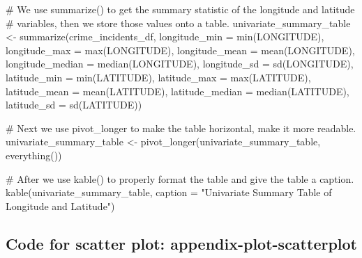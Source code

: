 \documentclass[
]{article}
\newenvironment{Shaded}{}{}
\newcommand{\AttributeTok}[1]{#1}
\newcommand{\CommentTok}[1]{\textcolor[rgb]{0.00,0.50,0.00}{#1}}
\newcommand{\FunctionTok}[1]{#1}
\newcommand{\NormalTok}[1]{#1}
\newcommand{\OtherTok}[1]{\textcolor[rgb]{1.00,0.25,0.00}{#1}}
\newcommand{\StringTok}[1]{\textcolor[rgb]{0.00,0.50,0.50}{#1}}
\begin{document}
\begin{Shaded}
\begin{Highlighting}[]
\CommentTok{\# We use summarize() to get the summary statistic of the longitude and latitude }
\CommentTok{\# variables, then we store those values onto a table.}
\NormalTok{univariate\_summary\_table }\OtherTok{\textless{}{-}} \FunctionTok{summarize}\NormalTok{(crime\_incidents\_df,}
                                      \AttributeTok{longitude\_min =} \FunctionTok{min}\NormalTok{(LONGITUDE),}
                                      \AttributeTok{longitude\_max =} \FunctionTok{max}\NormalTok{(LONGITUDE),}
                                      \AttributeTok{longitude\_mean =} \FunctionTok{mean}\NormalTok{(LONGITUDE),}
                                      \AttributeTok{longitude\_median =} \FunctionTok{median}\NormalTok{(LONGITUDE),}
                                      \AttributeTok{longitude\_sd =} \FunctionTok{sd}\NormalTok{(LONGITUDE),}
                                      \AttributeTok{latitude\_min =} \FunctionTok{min}\NormalTok{(LATITUDE),}
                                      \AttributeTok{latitude\_max =} \FunctionTok{max}\NormalTok{(LATITUDE),}
                                      \AttributeTok{latitude\_mean =} \FunctionTok{mean}\NormalTok{(LATITUDE),}
                                      \AttributeTok{latitude\_median =} \FunctionTok{median}\NormalTok{(LATITUDE),}
                                      \AttributeTok{latitude\_sd =} \FunctionTok{sd}\NormalTok{(LATITUDE)) }

\CommentTok{\# Next we use pivot\_longer to make the table horizontal, make it more readable.}
\NormalTok{univariate\_summary\_table }\OtherTok{\textless{}{-}} \FunctionTok{pivot\_longer}\NormalTok{(univariate\_summary\_table, }\FunctionTok{everything}\NormalTok{())}

\CommentTok{\# After we use kable() to properly format the table and give the table a caption.}
\FunctionTok{kable}\NormalTok{(univariate\_summary\_table, }\AttributeTok{caption =} \StringTok{"Univariate Summary Table of Longitude and Latitude"}\NormalTok{)}
\end{Highlighting}
\end{Shaded}

\subsection{Code for scatter plot:
appendix-plot-scatterplot}\label{code-for-scatter-plot-appendix-plot-scatterplot}
\end{document}
